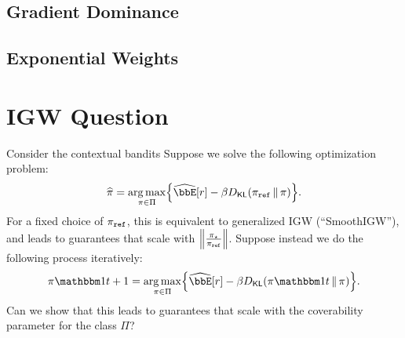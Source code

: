 \documentclass{article}
\begin{document}
\subsection{Gradient Dominance}

\subsection{Exponential Weights}



\section{IGW Question}
Consider the contextual bandits
Suppose we solve the following optimization problem:
\[
  \pihat=\argmax_{\pi\in\Pi}\crl*{
    \Eh\brk*{r} - \beta\Dkl{\piref}{\pi}}.
\]
For a fixed choice of $\piref$, this is equivalent to generalized IGW
(``SmoothIGW''), and leads to guarantees that scale with
$\nrm*{\frac{\pistar}{\piref}}$. Suppose instead we do the following
process iteratively:
\[
  \pi\ind{t+1}=\argmax_{\pi\in\Pi}\crl*{
    \Eh\brk*{r} - \beta\Dkl{\pi\ind{t}}{\pi}}.
\]
Can we show that this leads to guarantees that scale with the
coverability parameter for the class $\Pi$?


 
\end{document}
